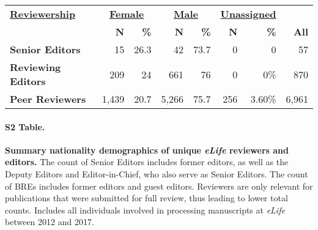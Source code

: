 \documentclass[10pt,letterpaper]{article}
\begin{document}
\begin{table}[!h]
\centering
\begin{tabular}{l|rr|rr|rr|r}
{\ul \textbf{Reviewership}} & \multicolumn{2}{c|}{{\ul \textbf{Female}}} & \multicolumn{2}{c|}{{\ul \textbf{Male}}} & \multicolumn{2}{c|}{{\ul \textbf{Unassigned}}} & \multicolumn{1}{c}{{\ul \textbf{}}} \\
                            & \textbf{N}          & \textbf{\%}          & \textbf{N}         & \textbf{\%}         & \textbf{N}            & \textbf{\%}            & \textbf{All}                        \\
\textbf{Senior Editors}     & 15                  & 26.3                 & 42                 & 73.7                & 0                     & 0                      & 57                                  \\
\textbf{Reviewing Editors}  & 209                 & 24                   & 661                & 76                  & 0                     & 0\%                    & 870                                 \\
\textbf{Peer Reviewers}     & 1,439               & 20.7                 & 5,266              & 75.7                & 256                   & 3.60\%                 & 6,961                              
\end{tabular}
\end{table}

\newpage
\paragraph*{S2 Table.}
\label{S2_Table}
{\bf Summary nationality demographics of unique \textit{eLife} reviewers and editors.} The count of Senior Editors includes former editors, as well as the Deputy Editors and Editor-in-Chief, who also serve as Senior Editors. The count of BREs includes former editors and guest editors. Reviewers are only relevant for publications that were submitted for full review, thus leading to lower total counts. Includes all individuals involved in processing manuscripts at \textit{eLife} between 2012 and 2017. 
\end{document}
